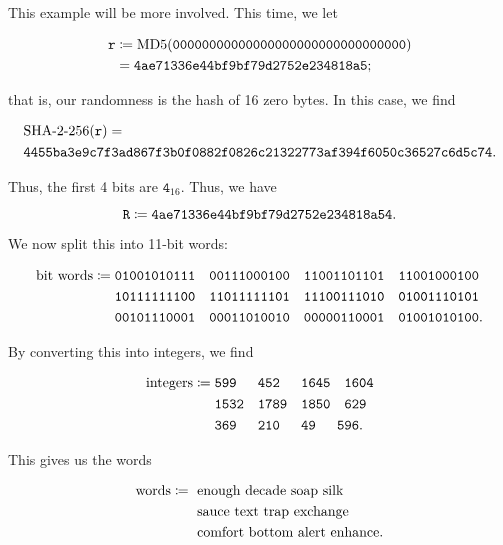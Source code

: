 \begin{example}

This example will be more involved.
This time, we let

\begin{align}
    \texttt{r} &\coloneqq{} \text{MD5{}}(\texttt{00000000000000000000000000000000})
        \nonumber\\
    &= \texttt{4ae71336e44bf9bf79d2752e234818a5};
\end{align}

\noindent
that is, our randomness is the \MDFive{} hash of 16 zero bytes.
In this case, we find

\begin{align}
    &\text{\ShaTwo{}-256}(\texttt{r}) = \nonumber\\
    &\texttt{4455ba3e9c7f3ad867f3b0f0882f0826c21322773af394f6050c36527c6d5c74}.
\end{align}

\noindent
Thus, the first 4 bits are $\texttt{4}_{16}$.
Thus, we have

\begin{equation}
    \texttt{R} \coloneqq{} \texttt{4ae71336e44bf9bf79d2752e234818a54}.
\end{equation}

We now split this into 11-bit words:

\begin{align}
    \text{bit words} \coloneqq{}
    &\texttt{01001010111}\quad
    \texttt{00111000100}\quad
    \texttt{11001101101}\quad
    \texttt{11001000100} \nonumber\\
    &\texttt{10111111100}\quad
    \texttt{11011111101}\quad
    \texttt{11100111010}\quad
    \texttt{01001110101} \nonumber\\
    &\texttt{00101110001}\quad
    \texttt{00011010010}\quad
    \texttt{00000110001}\quad
    \texttt{01001010100}.
\end{align}

\noindent
By converting this into integers, we find

\begin{align}
    \text{integers} \coloneqq{}
    &\texttt{599 }\quad
    \texttt{452 }\quad
    \texttt{1645}\quad
    \texttt{1604} \nonumber\\
    &\texttt{1532}\quad
    \texttt{1789}\quad
    \texttt{1850}\quad
    \texttt{629 } \nonumber\\
    &\texttt{369 }\quad
    \texttt{210 }\quad
    \texttt{49  }\quad
    \texttt{596}.
\end{align}

\noindent
This gives us the words


\begin{align}
    \text{words} \coloneqq{}
        &\text{ enough decade soap silk } \nonumber\\
        &\text{ sauce text trap exchange } \nonumber\\
        &\text{ comfort bottom alert enhance}.
\end{align}
\end{example}

